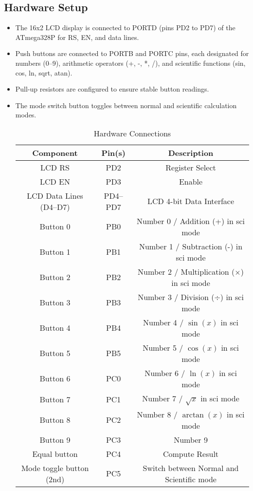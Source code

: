 \documentclass[journal]{IEEEtran}
\begin{document}
\subsection{Hardware Setup}
\begin{itemize}
    \item The 16x2 LCD display is connected to PORTD (pins PD2 to PD7) of the ATmega328P for RS, EN, and data lines.
    \item Push buttons are connected to PORTB and PORTC pins, each designated for numbers (0--9), arithmetic operators (+, -, *, /), and scientific functions (sin, cos, ln, sqrt, atan).
    \item Pull-up resistors are configured to ensure stable button readings.
    \item The mode switch button toggles between normal and scientific calculation modes.
\begin{table}[h!]
\centering
\caption{Hardware Connections}
\begin{tabular}{|c|c|c|}
\hline
\textbf{Component} & \textbf{Pin(s)} & \textbf{Description} \\
\hline
LCD RS & PD2 & Register Select \\
LCD EN & PD3 & Enable \\
LCD Data Lines (D4–D7) & PD4–PD7 & LCD 4-bit Data Interface \\
\hline
Button 0 & PB0 & Number 0 / Addition (+) in sci mode \\
Button 1 & PB1 & Number 1 / Subtraction (-) in sci mode \\
Button 2 & PB2 & Number 2 / Multiplication (×) in sci mode \\
Button 3 & PB3 & Number 3 / Division (÷) in sci mode \\
Button 4 & PB4 & Number 4 / $\sin(x)$ in sci mode \\
Button 5 & PB5 & Number 5 / $\cos(x)$ in sci mode \\
Button 6 & PC0 & Number 6 / $\ln(x)$ in sci mode \\
Button 7 & PC1 & Number 7 / $\sqrt{x}$ in sci mode \\
Button 8 & PC2 & Number 8 / $\arctan(x)$ in sci mode \\
Button 9 & PC3 & Number 9 \\
Equal button & PC4 & Compute Result \\
Mode toggle button (2nd) & PC5 & Switch between Normal and Scientific mode \\
\hline
\end{tabular}
\end{table}

\end{itemize}
\end{document}
